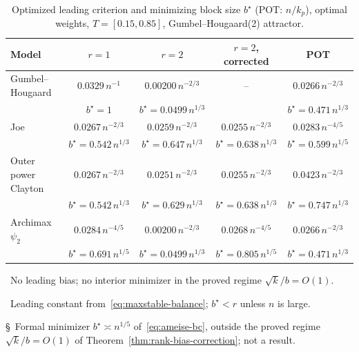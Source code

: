 \begin{table}[t]
\centering
\small
\caption{Optimized leading criterion and minimizing block size $b^\star$ (POT: $n/k_p$), optimal weights, $T=[0.15,0.85]$, Gumbel--Hougaard(2) attractor.}
\label{tab:comparison-bstar}
\begin{tabular}{lcccc}
\toprule
Model & $r=1$ & $r=2$ & $r=2$, corrected & POT\\
\midrule
Gumbel--Hougaard & $0.0329\,n^{-1}$ & $0.00200\,n^{-2/3}$\rlap{\,\textsuperscript{\ddag}} & --\rlap{\,\textsuperscript{\dag}} & $0.0266\,n^{-2/3}$\\
 & $\scriptstyle b^\star=1$ & $\scriptstyle b^\star=0.0499\,n^{1/3}$ &  & $\scriptstyle b^\star=0.471\,n^{1/3}$\\[2pt]
Joe & $0.0267\,n^{-2/3}$ & $0.0259\,n^{-2/3}$ & $0.0255\,n^{-2/3}$ & $0.0283\,n^{-4/5}$\\
 & $\scriptstyle b^\star=0.542\,n^{1/3}$ & $\scriptstyle b^\star=0.647\,n^{1/3}$ & $\scriptstyle b^\star=0.638\,n^{1/3}$ & $\scriptstyle b^\star=0.599\,n^{1/5}$\\[2pt]
Outer power Clayton & $0.0267\,n^{-2/3}$ & $0.0251\,n^{-2/3}$ & $0.0255\,n^{-2/3}$ & $0.0423\,n^{-2/3}$\\
 & $\scriptstyle b^\star=0.542\,n^{1/3}$ & $\scriptstyle b^\star=0.629\,n^{1/3}$ & $\scriptstyle b^\star=0.638\,n^{1/3}$ & $\scriptstyle b^\star=0.747\,n^{1/3}$\\[2pt]
Archimax $\psi_2$ & $0.0284\,n^{-4/5}$ & $0.00200\,n^{-2/3}$\rlap{\,\textsuperscript{\ddag}} & $0.0268\,n^{-4/5}$\rlap{\,\textsuperscript{\S}} & $0.0266\,n^{-2/3}$\\
 & $\scriptstyle b^\star=0.691\,n^{1/5}$ & $\scriptstyle b^\star=0.0499\,n^{1/3}$ & $\scriptstyle b^\star=0.805\,n^{1/5}$ & $\scriptstyle b^\star=0.471\,n^{1/3}$\\[2pt]
\bottomrule
\end{tabular}

\smallskip
{\footnotesize
\dag~No leading bias; no interior minimizer in the proved regime $\sqrt{k}/b=O(1)$.\par
\ddag~Leading constant from~\eqref{eq:maxstable-balance}; $b^\star<r$ unless $n$ is large.\par
\S~Formal minimizer $b^\star\asymp n^{1/5}$ of~\eqref{eq:ameise-bc}, outside the
proved regime $\sqrt{k}/b=O(1)$ of Theorem~\ref{thm:rank-bias-correction}; not a result.}
\end{table}
